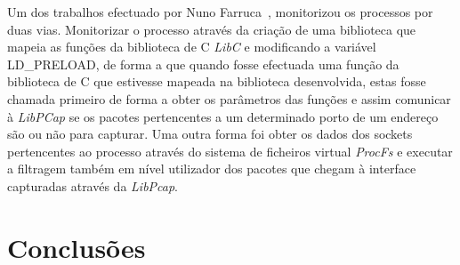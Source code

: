 \documentclass[runningheads,a4paper]{llncs}
\begin{document}
Um dos trabalhos efectuado por Nuno Farruca~\cite{farruca}, monitorizou os processos por duas vias. Monitorizar o processo através da criação de uma biblioteca que mapeia as funções da biblioteca de C \textit{LibC} e modificando a variável LD_PRELOAD, de forma a que quando fosse efectuada uma função da biblioteca de C que estivesse mapeada na biblioteca desenvolvida, estas fosse chamada primeiro de forma a obter os parâmetros das funções e assim comunicar à \textit{LibPCap} se os pacotes pertencentes a um determinado porto de um endereço são ou não para capturar. Uma outra forma foi obter os dados dos sockets pertencentes ao processo através do sistema de ficheiros virtual \textit{ProcFs} e executar a filtragem também em nível utilizador dos pacotes que chegam à interface capturadas através da \textit{LibPcap}.


\section{Conclusões}
\label{sec:conclusions}




\end{document}
